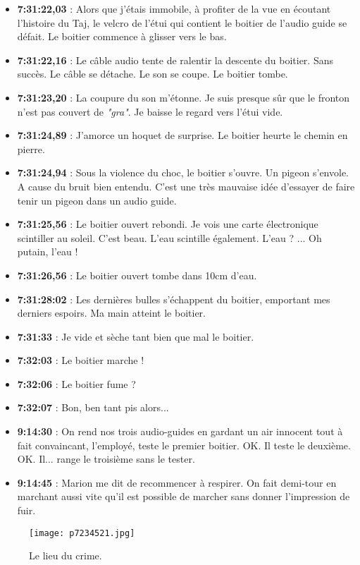 \documentclass{book}
\begin{document}
\begin{itemize}
	\item \textbf{7:31:22,03} : Alors que j'étais immobile, à profiter de la vue en écoutant l'histoire du Taj, le velcro de l'étui qui contient le boitier de l'audio guide se défait. Le boitier commence à glisser vers le bas.
	\item \textbf{7:31:22,16} : Le câble audio tente de ralentir la descente du boitier. Sans succès. Le câble se détache. Le son se coupe. Le boitier tombe.
	\item \textbf{7:31:23,20} : La coupure du son m'étonne. Je suis presque sûr que le fronton n'est pas couvert de \emph{"gra"}. Je baisse le regard vers l'étui vide.
	\item \textbf{7:31:24,89} : J'amorce un hoquet de surprise. Le boitier heurte le chemin en pierre.
	\item \textbf{7:31:24,94} : Sous la violence du choc, le boitier s'ouvre. Un pigeon s'envole. A cause du bruit bien entendu. C'est une très mauvaise idée d'essayer de faire tenir un pigeon dans un audio guide.
	\item \textbf{7:31:25,56} : Le boitier ouvert rebondi. Je vois une carte électronique scintiller au soleil. C'est beau. L'eau scintille également. L'eau ? ... Oh putain, l'eau !
	\item \textbf{7:31:26,56} : Le boitier ouvert tombe dans 10cm d'eau.
	\item \textbf{7:31:28:02} : Les dernières bulles s'échappent du boitier, emportant mes derniers espoirs. Ma main atteint le boitier.
	\item \textbf{7:31:33} : Je vide et sèche tant bien que mal le boitier.
	\item \textbf{7:32:03} : Le boitier marche !
	\item \textbf{7:32:06} : Le boitier fume ?
	\item \textbf{7:32:07} : Bon, ben tant pis alors...
	\item \textbf{9:14:30} : On rend nos trois audio-guides en gardant un air innocent tout à fait convaincant, l'employé, teste le premier boitier. OK. Il teste le deuxième. OK. Il... range le troisième sans le tester.
	\item \textbf{9:14:45} : Marion me dit de recommencer à respirer. On fait demi-tour en marchant aussi vite qu'il est possible de marcher sans donner l'impression de fuir.
\end{itemize}



\begin{figure}[h]
\centering
\texttt{[image: p7234521.jpg]}
\caption*{Le lieu du crime.}
\end{figure}
\end{document}
